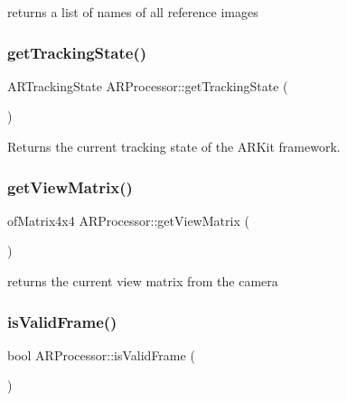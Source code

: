 returns a list of names of all reference images 

\mbox{\label{class_a_r_processor_aa53d195b42b23d9208071692fd5ac28d}} 
\subsubsection{\texorpdfstring{get\+Tracking\+State()}{getTrackingState()}}
{\footnotesize\ttfamily A\+R\+Tracking\+State A\+R\+Processor\+::get\+Tracking\+State (\begin{DoxyParamCaption}{ }\end{DoxyParamCaption})}



Returns the current tracking state of the A\+R\+Kit framework. 

\mbox{\label{class_a_r_processor_a2e1d4cde9029bad28ac797c94e73096a}} 
\subsubsection{\texorpdfstring{get\+View\+Matrix()}{getViewMatrix()}}
{\footnotesize\ttfamily of\+Matrix4x4 A\+R\+Processor\+::get\+View\+Matrix (\begin{DoxyParamCaption}{ }\end{DoxyParamCaption})\hspace{0.3cm}{\ttfamily [inline]}}



returns the current view matrix from the camera 

\mbox{\label{class_a_r_processor_a0ef0ae984393513e3d3417bf659e022a}} 
\subsubsection{\texorpdfstring{is\+Valid\+Frame()}{isValidFrame()}}
{\footnotesize\ttfamily bool A\+R\+Processor\+::is\+Valid\+Frame (\begin{DoxyParamCaption}{ }\end{DoxyParamCaption})\hspace{0.3cm}{\ttfamily [inline]}}

